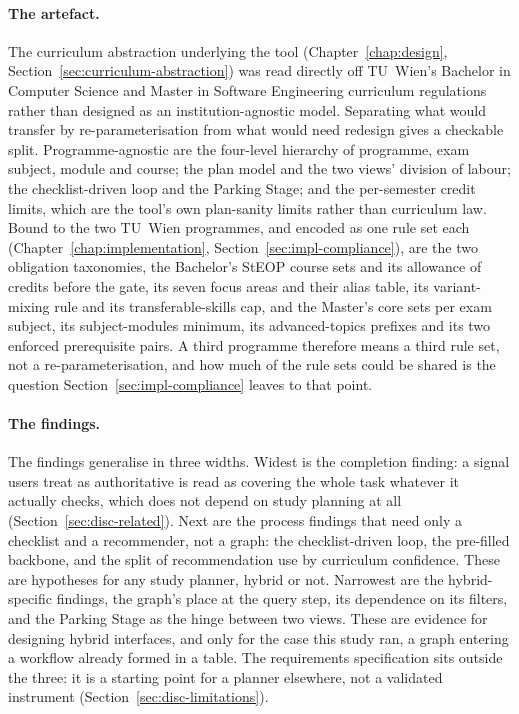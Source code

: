 \paragraph{The artefact.}
The curriculum abstraction underlying the tool (Chapter~\ref{chap:design}, Section~\ref{sec:curriculum-abstraction}) was read directly off TU~Wien's Bachelor in Computer Science and Master in Software Engineering curriculum regulations rather than designed as an institution-agnostic model. Separating what would transfer by re-parameterisation from what would need redesign gives a checkable split. Programme-agnostic are the four-level hierarchy of programme, exam subject, module and course; the plan model and the two views' division of labour; the checklist-driven loop and the Parking Stage; and the per-semester credit limits, which are the tool's own plan-sanity limits rather than curriculum law. Bound to the two TU~Wien programmes, and encoded as one rule set each (Chapter~\ref{chap:implementation}, Section~\ref{sec:impl-compliance}), are the two obligation taxonomies, the Bachelor's StEOP course sets and its allowance of credits before the gate, its seven focus areas and their alias table, its variant-mixing rule and its transferable-skills cap, and the Master's core sets per exam subject, its subject-modules minimum, its advanced-topics prefixes and its two enforced prerequisite pairs. A third programme therefore means a third rule set, not a re-parameterisation, and how much of the rule sets could be shared is the question Section~\ref{sec:impl-compliance} leaves to that point.

\paragraph{The findings.}
The findings generalise in three widths. Widest is the completion finding: a signal users treat as authoritative is read as covering the whole task whatever it actually checks, which does not depend on study planning at all (Section~\ref{sec:disc-related}). Next are the process findings that need only a checklist and a recommender, not a graph: the checklist-driven loop, the pre-filled backbone, and the split of recommendation use by curriculum confidence. These are hypotheses for any study planner, hybrid or not. Narrowest are the hybrid-specific findings, the graph's place at the query step, its dependence on its filters, and the Parking Stage as the hinge between two views. These are evidence for designing hybrid interfaces, and only for the case this study ran, a graph entering a workflow already formed in a table. The requirements specification sits outside the three: it is a starting point for a planner elsewhere, not a validated instrument (Section~\ref{sec:disc-limitations}).
